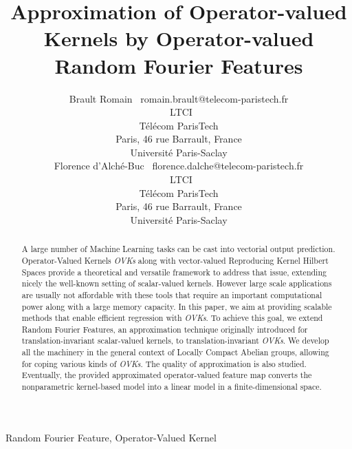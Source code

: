 \documentclass[twoside,11pt]{article}
\begin{document}
\title{Approximation of Operator-valued Kernels by Operator-valued Random Fourier Features}

\author{\name{}Brault Romain
       \email~romain.brault@telecom-paristech.fr \\
       \addr~LTCI\\
       T\'el\'ecom ParisTech\\
       Paris, 46 rue Barrault, France \\
       Universit\'e Paris-Saclay \\
       \AND%
       \name{}Florence d'Alch\'e-Buc
       \email~florence.dalche@telecom-paristech.fr \\
       \addr~LTCI\\
       T\'el\'ecom ParisTech\\
       Paris, 46 rue Barrault, France \\
       Universit\'e Paris-Saclay}


\maketitle

\begin{abstract}%
   A large number of Machine Learning tasks can be cast into vectorial output prediction.
    Operator-Valued Kernels \emph{\aclp{OVK}} along with vector-valued
    Reproducing Kernel Hilbert Spaces provide a theoretical and versatile
    framework to address that issue, extending nicely the well-known setting of
    scalar-valued kernels.  However large scale applications are usually not
    affordable with these tools that require an important computational power
    along with a large memory capacity. In this paper, we aim at providing
    scalable methods that enable efficient regression with \emph{\aclp{OVK}}.
    To achieve this goal, we extend Random Fourier Features, an approximation
    technique originally introduced for translation-invariant scalar-valued
    kernels, to translation-invariant \emph{\aclp{OVK}}. We develop all the
    machinery in the general context of Locally Compact Abelian groups,
    allowing for coping various kinds of \emph{\aclp{OVK}}. The quality of approximation is also studied. Eventually,  the provided
    approximated operator-valued feature map converts the nonparametric
    kernel-based model into a linear model in a finite-dimensional space.
\end{abstract}
\begin{keywords}
    Random Fourier Feature, Operator-Valued Kernel
\end{keywords}
\end{document}
